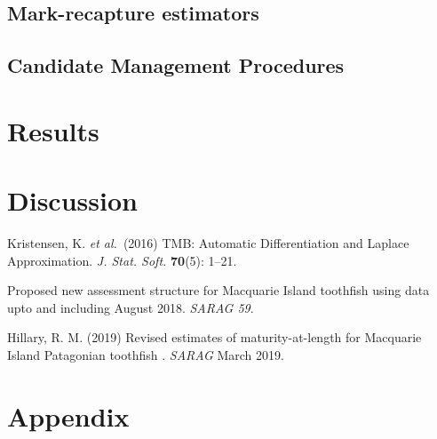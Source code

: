 \documentclass[12pt,a4paper,twoside,times,sky,standard]{csiroreport2017}
\newcommand{\etal}{\textit{et al.}}
\begin{document}
\subsection{Mark-recapture estimators}

\subsection{Candidate Management Procedures}

\section{Results}

\section{Discussion}

\clearpage
\begin{thebibliography}{99}

     Kristensen, K. \etal~(2016) TMB: Automatic Differentiation and Laplace Approximation. \textit{J. Stat. Soft.} {\bf 70}(5): 1--21.
         
     Proposed new assessment structure for Macquarie Island toothfish using data upto and including August 2018. \textit{SARAG 59}.

     Hillary, R. M. (2019) Revised estimates of maturity-at-length for Macquarie Island Patagonian toothfish . \textit{SARAG} March 2019.

\end{thebibliography}

\clearpage

\section*{Appendix}
\end{document}
